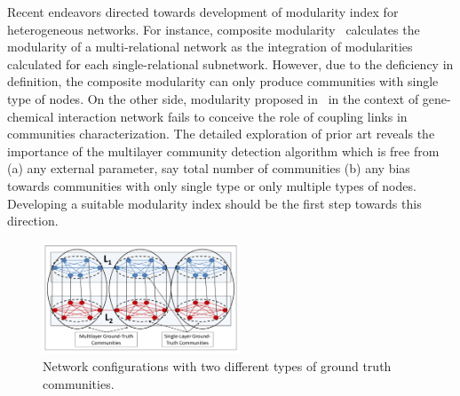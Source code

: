 
Recent endeavors directed towards development of modularity index for heterogeneous networks.
For instance, composite modularity~\cite{CompMod} calculates
the modularity of a multi-relational network as the integration of modularities calculated for each single-relational subnetwork.
However, due to the deficiency in definition,
the composite modularity can only produce communities with single type of nodes. On the other side, modularity
proposed in~\cite{medical_paper} in the context of gene-chemical interaction network fails to conceive the role of coupling links
in communities characterization. The detailed exploration of prior art reveals the importance of the multilayer community
detection algorithm which is free from (a) any external parameter, say total number of communities (b) any bias towards
communities with only single type or only multiple types of nodes. Developing a suitable modularity index should be the first
step towards this direction.

\begin{figure}
\centering
\includegraphics[width=2.3in]{./images/image31.pdf}
\vspace{-0.1in}
\caption{Network configurations with two different types of ground truth communities.}
\vspace{-0.23in}
\label{N0}
\end{figure}

